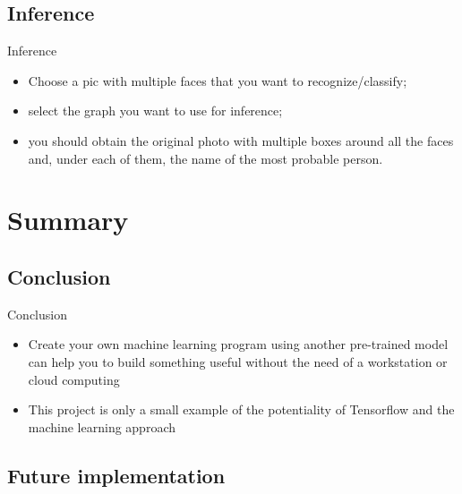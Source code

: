 \documentclass{beamer}
\begin{document}
\subsection{Inference}
\begin{frame}{Inference}
\begin{itemize}
		\setlength\itemsep{1em}
		[triangle]
		
			\item 
				Choose a pic with multiple faces that you want to recognize/classify;
			\item 
				select the graph you want to use for inference;
			\item
				you should obtain the original photo with multiple boxes around all the faces and, under each of them, the name of the most probable person.
		
	\end{itemize}
\end{frame}




\section{Summary}

\subsection{Conclusion}
\begin{frame}{Conclusion}
	\begin{itemize}
	\setlength\itemsep{1em}
	[triangle]
	\item 
		Create your own machine learning program using another pre-trained model can help you to build 					something useful without the need of a workstation or cloud computing
	\item 
		This project is only a small example of the potentiality of Tensorflow and the machine learning approach
	\end{itemize}
\end{frame}

\subsection{Future implementation}
\end{document}
